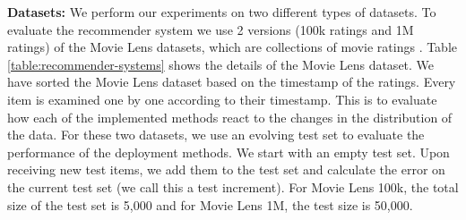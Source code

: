 \documentclass[10pt,conference,letterpaper]{IEEEtran}
\begin{document}
\textbf{Datasets:} We perform our experiments on two different types of datasets.
To evaluate the recommender system we use 2 versions (100k ratings and 1M ratings) of the Movie Lens datasets, which are collections of movie ratings \cite{harper2016movielens}.
Table \ref{table:recommender-systems} shows the details of the Movie Lens dataset.
We have sorted the Movie Lens dataset based on the timestamp of the ratings.
Every item is examined one by one according to their timestamp.
This is to evaluate how each of the implemented methods react to the changes in the distribution of the data.
For these two datasets, we use an evolving test set to evaluate the performance of the deployment methods.
We start with an empty test set.
Upon receiving new test items, we add them to the test set and calculate the error on the current test set (we call this a test increment).
For Movie Lens 100k, the total size of the test set is 5,000 and for Movie Lens 1M, the test size is 50,000. 
\end{document}
